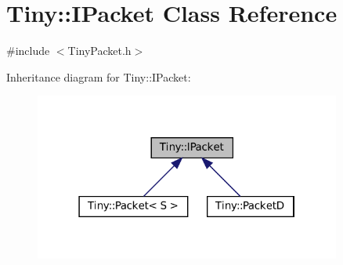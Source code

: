 \hypertarget{classTiny_1_1IPacket}{}\section{Tiny\+:\+:I\+Packet Class Reference}
\label{classTiny_1_1IPacket}


{\ttfamily \#include $<$Tiny\+Packet.\+h$>$}



Inheritance diagram for Tiny\+:\+:I\+Packet\+:
\nopagebreak
\begin{figure}[H]
\begin{center}
\leavevmode
\includegraphics[width=286pt]{classTiny_1_1IPacket__inherit__graph}
\end{center}
\end{figure}
